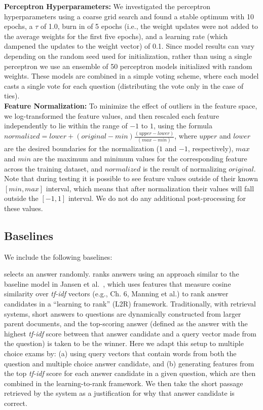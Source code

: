 {\flushleft \textbf{Perceptron Hyperparameters:}} We investigated the perceptron hyperparameters using a coarse grid search and found a stable optimum with 10 epochs, a $\tau$ of 1.0, burn in of 5 epochs (i.e., the weight updates were not added to the average weights for the first five epochs), and a learning rate (which dampened the updates to the weight vector) of 0.1. Since model results can vary depending on the random seed used for initialization, rather than using a single perceptron we use an ensemble of 50 perceptron models initialized with random weights.  These models are combined in a simple voting scheme, where each model casts a single vote for each question (distributing the vote only in the case of ties).\\

{\flushleft \textbf{Feature Normalization:}} To minimize the effect of outliers in the feature space, we log-transformed the feature values, and then rescaled each feature independently to lie within the range of $-1$ to $1$, using the formula
\mbox{$normalized  = lower + (original - min)\frac{(upper - lower)}{(max - min)}$},
where $upper$ and $lower$ are the desired boundaries for the normalization ($1$ and $-1$, respectively), $max$ and $min$ are the maximum and minimum values for the corresponding feature across the training dataset, and $normalized$ is the result of normalizing $original$.
Note that during testing it is possible to see feature values outside of their known $[min, max]$ interval, which means that after normalization their values will fall outside the $[-1, 1]$ interval. We do not do any additional post-processing for these values.


\subsection{Baselines}
\label{sec:baselines}

We include the following baselines: 

{} selects an answer randomly.
{} ranks answers using an approach similar to the baseline model in Jansen et al.~\citeyear{jansen14}, which uses features that measure cosine similarity over {\em tf-idf} vectors (e.g., Ch. 6, Manning et al.\citeyear{manning08}) to rank answer candidates in a ``learning to rank'' (L2R) framework.  
Traditionally, with retrieval systems, short answers to questions are dynamically constructed from larger parent documents, and the top-scoring answer (defined as the answer with the highest {\em tf-idf} score between that answer candidate and a query vector made from the question) is taken to be the winner.  Here we adapt this setup to multiple choice exams by: (a) using query vectors that contain words from both the question and multiple choice answer candidate, and (b) generating features from the top {\em tf-idf} score for each answer candidate in a given question, which are then combined in the learning-to-rank framework.  We then take the short passage retrieved by the system as a justification for why that answer candidate is correct. 

